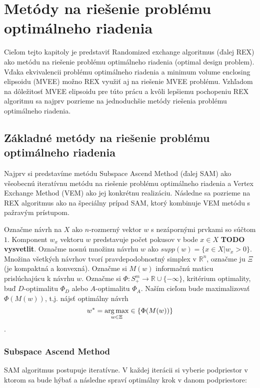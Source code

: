 \chapter{Metódy na riešenie problému optimálneho riadenia}

Cieľom tejto kapitoly je predstaviť Randomized exchange algoritmus \cite{rex_harman} (ďalej REX) ako metódu na riešenie problému optimálneho riadenia (optimal design problem). Vďaka ekvivalencii problému optimálneho riadenia a minimum volume enclosing elipsoidu (MVEE) \cite{rex_harman} možno REX využiť aj na riešenie MVEE problému.
Vzhľadom na dôležitosť MVEE elipsoidu pre túto prácu a kvôli lepšiemu pochopeniu REX algoritmu sa najprv pozrieme na jednoduchšie metódy riešenia problému optimálneho riadenia.

\section{Základné metódy na riešenie problému optimálneho riadenia}

Najprv si predstavíme metódu Subspace Ascend Method (ďalej SAM) ako všeobecnú iteratívnu metódu na riešenie problému optimálneho riadenia a Vertex Exchange Method (VEM) ako jej konkrétnu realizáciu. Následne sa pozrieme na REX algoritmus ako na špeciálny prípad SAM, ktorý kombinuje VEM metódu s pažravým prístupom.

Označme návrh na $X$ ako $n$-rozmerný vektor $w$ s nezápornými prvkami so súčtom $1$. Komponent $w_x$ vektoru $w$ predstavuje počet pokusov v bode $x \in X$ \textbf{TODO vysvetlit}. Označme nosnú množinu návrhu $w$ ako $supp(w)=\{x \in X| w_x>0\}$. Množina všetkých návrhov tvorí pravdepodobnostný simplex v $\mathbb{R}^n$, označme ju $\Xi$ (je kompaktná a konvexná). Označme si $M(w)$ informačnú maticu prislúchajúcu k návrhu $w$. Označme si $\Phi: S^m_+ \rightarrow \mathbb{R} \cup \{-\infty\}$, kritérium optimality, buď $D$-optimalitu $\Phi_D$ alebo $A$-optimalitu $\Phi_A$. Naším cieľom bude maximalizovať $\Phi(M(w))$, t.j. nájsť optimálny návrh $$w^* = \operatorname*{arg\,max}_{w \in \Xi} \in \{\Phi(M(w))\}$$.

\subsection{Subspace Ascend Method}

SAM algoritmus postupuje iteratívne. V každej iterácii si vyberie podpriestor v ktorom sa bude hýbať a následne spraví optimálny krok v danom podpriestore:

